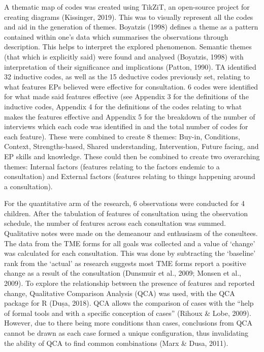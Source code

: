 \documentclass[
  english,
  man,floatsintext]{apa6}
\begin{document}
A thematic map of codes was created using TikZiT, an open-source project
for creating diagrams (Kissinger, 2019). This was to visually
represent all the codes and aid in the generation of themes.
Boyatzis (1998) defines a theme as a
pattern contained within one's data which summarises the observations
through description. This helps to interpret the explored phenomenon.
Semantic themes (that which is explicitly said) were found and analysed
(Boyatzis, 1998) with interpretation
of their significance and implications
(Patton, 1990). TA identified 32 inductive
codes, as well as the 15 deductive codes previously set, relating to
what features EPs believed were effective for consultation. 6 codes were
identified for what made said features effective (see Appendix 3 for the
definitions of the inductive codes, Appendix 4 for the definitions of
the codes relating to what makes the features effective and Appendix 5
for the breakdown of the number of interviews which each code was
identified in and the total number of codes for each feature). These
were combined to create 8 themes: Buy-in, Conditions, Context,
Strengths-based, Shared understanding, Intervention, Future facing, and
EP skills and knowledge. These could then be combined to create two
overarching themes: Internal factors (features relating to the factors
endemic to a consultation) and External factors (features relating to
things happening around a consultation).

For the quantitative arm of the research, 6 observations were conducted for 4 children. After the tabulation of
features of consultation using the observation schedule, the number of
features across each consultation was summed. Qualitative notes were
made on the demeanour and enthusiasm of the consultees. The data from
the TME forms for all goals was collected and a value of `change' was
calculated for each consultation. This was done by subtracting the
`baseline' rank from the `actual' as research suggests most TME forms
report a positive change as a result of the consultation
(Dunsmuir et al., 2009; Monsen et al., 2009).
To explore the relationship between the presence of features and
reported change, Qualitative Comparison Analysis (QCA) was used, with
the QCA package for R (Dușa, 2018). QCA allows
the comparison of cases with the ``help of formal tools and with a
specific conception of cases'' (Rihoux \& Lobe, 2009). However, due to there being more conditions than cases, conclusions from QCA cannot be drawn as each case formed a unique configuration, thus invalidating the ability of QCA to find common combinations (Marx \& Dusa, 2011).
\end{document}
